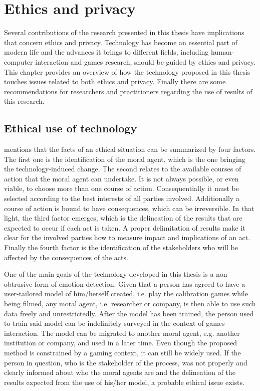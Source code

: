 \chapter{Ethics and privacy}
\label{ch:ethics}

Several contributions of the research presented in this thesis have implications that concern ethics and privacy. Technology has become an essential part of modern life and the advances it brings to different fields, including human-computer interaction and games research, should be guided by ethics and privacy. This chapter provides an overview of how the technology proposed in this thesis touches issues related to both ethics and privacy. Finally there are some recommendations for researchers and practitioners regarding the use of results of this research.

\section{Ethical use of technology}

\textcite{mason1995applying} mentions that the facts of an ethical situation can be summarized by four factors. The first one is the identification of the moral agent, which is the one bringing the technology-induced change. The second relates to the available courses of action that the moral agent can undertake. It is not always possible, or even viable, to choose more than one course of action. Consequentially it must be selected according to the best interests of all parties involved. Additionally a course of action is bound to have consequences, which can be irreversible. In that light, the third factor emerges, which is the delineation of the results that are expected to occur if each act is taken. A proper delimitation of results make it clear for the involved parties how to measure impact and implications of an act. Finally the fourth factor is the identification of the stakeholders who will be affected by the consequences of the acts.

One of the main goals of the technology developed in this thesis is a non-obtrusive form of emotion detection. Given that a person has agreed to have a user-tailored model of him/herself created, i.e. play the calibration games while being filmed, any moral agent, i.e. researcher or company, is then able to use such data freely and unrestrictedly. After the model has been trained, the person used to train said model can be indefinitely surveyed in the context of games interaction. The model can be migrated to another moral agent, e.g. another institution or company, and used in a later time. Even though the proposed method is constrained by a gaming context, it can still be widely used. If the person in question, who is the stakeholder of the process, was not properly and clearly informed about who the moral agents are and the delineation of the results expected from the use of his/her model, a probable ethical issue exists.

